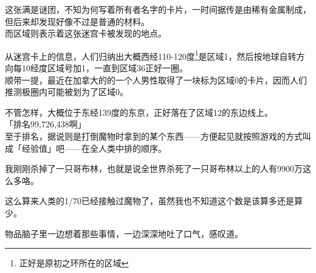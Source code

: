 这张满是谜团，不知为何写着所有者名字的卡片，一时间据传是由稀有金属制成，但后来却发现好像不过是普通的材料。\\

而区域则表示着这张迷宫卡被发现的地点。

从迷宫卡上的信息，人们归纳出大概西经110-120度\footnote{正好是原初之环所在的区域}是区域1，然后按地球自转方向每10经度区域号加1，一直到区域36正好一圈。\\

顺带一提，最近在加拿大的的一个人男性取得了一块标为区域0的卡片，因而人们推测极圈内可能被划为了区域0。

不管怎样，大概位于东经139度的东京，正好落在了区域12的东边线上。\\

「排名99,726,438啊」\\

至于排名，据说则是打倒魔物时拿到的某个东西——方便起见就按照游戏的方式叫成「经验值」吧——在全人类中排的顺序。

我刚刚杀掉了一只哥布林，也就是说全世界杀死了一只哥布林以上的人有9900万这么多咯。

这么算来人类的1/70已经接触过魔物了，虽然我也不知道这个数是该算多还是算少。

物品脑子里一边想着那些事情，一边深深地吐了口气，感叹道。\\

